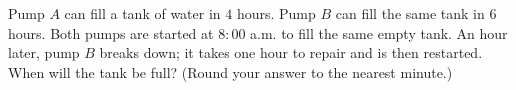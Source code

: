 Pump $A$ can fill a tank of water in $4$ hours. Pump $B$ can fill the same tank in $6$ hours. Both pumps are started at $8{:}00$ a.m. to fill the same empty tank. An hour later, pump $B$ breaks down; it takes one hour to repair and is then restarted. When will the tank be full? (Round your answer to the nearest minute.)
